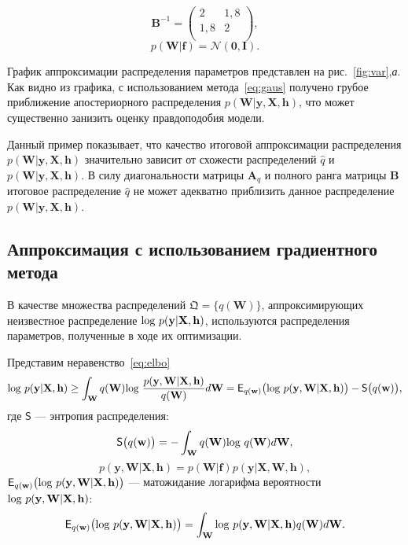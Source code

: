 \[
	\mathbf{B}^{-1} = \left( \begin{array}{cc}
	2 & 1,8 \\
	1,8 & 2\\
	\end{array}  \right),
\]
\[
	p(\mathbf{W}|\mathbf{f}) = \mathcal{N}(\mathbf{0}, \mathbf{I}).
\]

График аппроксимации распределения параметров представлен на рис.~\ref{fig:var},\textit{а}. Как видно из графика, с использованием метода~\eqref{eq:gaus} получено грубое приближение апостериорного распределения $p(\mathbf{W}|\mathbf{y}, \mathbf{X}, \mathbf{h})$, что может существенно занизить оценку правдоподобия модели.



{Данный пример показывает, что качество итоговой аппроксимации распределения $p(\mathbf{W}|\mathbf{y}, \mathbf{X}, \mathbf{h})$ значительно зависит от схожести распределений $\hat{q}$ и $p(\mathbf{W}|\mathbf{y}, \mathbf{X}, \mathbf{h})$. В силу диагональности матрицы $\mathbf{A}_q$ и полного ранга матрицы $\mathbf{B}$  итоговое распределение $\hat{q}$ не может адекватно приблизить данное распределение  $p(\mathbf{W}|\mathbf{y}, \mathbf{X}, \mathbf{h})$.}



\subsection{Аппроксимация с использованием градиентного метода}
В качестве множества распределений $\mathfrak{Q} = \{q(\mathbf{W})\}$, аппроксимирующих неизвестное распределение $\textnormal{log}~p(\mathbf{y}|\mathbf{X},\mathbf{h})$, используются распределения параметров, полученные в ходе их оптимизации. 

Представим неравенство~\eqref{eq:elbo}
\begin{equation}
\label{eq:elbo_entropy}
 \textnormal{log}~p(\mathbf{y}|\mathbf{X},\mathbf{h}) \geq \int_\mathbf{W} q(\mathbf{W})\textnormal{log}~\frac{p(\mathbf{y},\mathbf{W}|\mathbf{X}, \mathbf{h})}{q(\mathbf{W})}d\mathbf{W} =  \mathsf{E}_{q(\mathbf{w)}}\bigl(\textnormal{log~}p (\mathbf{y}, \mathbf{W}|\mathbf{X},\mathbf{h})\bigr) - \mathsf{S}\bigl({q(\mathbf{w)}}\bigr),
\end{equation}
где $\mathsf{S}$ --- энтропия распределения:
\[
\mathsf{S}\bigl({q(\mathbf{w)}}\bigr) = - \int_{\mathbf{W}} q(\mathbf{W})\textnormal{log}~q(\mathbf{W})d\mathbf{W},
\]
$$p (\mathbf{y}, \mathbf{W}|\mathbf{X},\mathbf{h}) = p (\mathbf{W}| \mathbf{f}) p (\mathbf{y}|\mathbf{X}, \mathbf{W},\mathbf{h}),$$
$\mathsf{E}_{q(\mathbf{w)}}\bigl(\textnormal{log~}p (\mathbf{y}, \mathbf{W}|\mathbf{X},\mathbf{h})\bigr)$ --- матожидание логарифма вероятности $\textnormal{log~}p (\mathbf{y}, \mathbf{W}|\mathbf{X},\mathbf{h})$:
\[
	\mathsf{E}_{q(\mathbf{w)}}\bigl(\textnormal{log~}p (\mathbf{y}, \mathbf{W}|\mathbf{X},\mathbf{h})\bigr) = \int_\mathbf{W} \textnormal{log~}p (\mathbf{y}, \mathbf{W}|\mathbf{X},\mathbf{h}) q(\mathbf{W}) d\mathbf{W}.
\]

